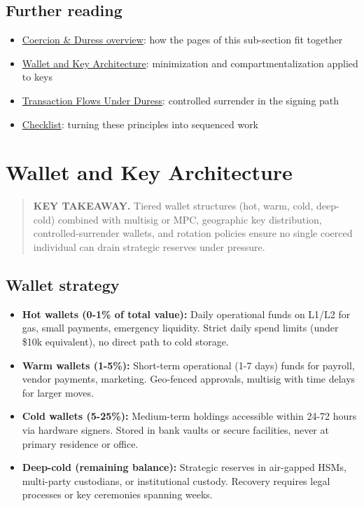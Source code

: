 \section{Further reading}\label{further-reading-2}

\begin{itemize}
\tightlist
\item
  \href{https://frameworks.securityalliance.dev/physical-security/coercion-and-duress/overview}{Coercion \& Duress overview}: how the pages of this sub-section fit together
\item
  \href{https://frameworks.securityalliance.dev/physical-security/coercion-and-duress/wallet-and-key-architecture}{Wallet and Key Architecture}: minimization and compartmentalization applied to keys
\item
  \href{https://frameworks.securityalliance.dev/physical-security/coercion-and-duress/transaction-flows-under-duress}{Transaction Flows Under Duress}: controlled surrender in the signing path
\item
  \href{https://frameworks.securityalliance.dev/physical-security/coercion-and-duress/checklist}{Checklist}: turning these principles into sequenced work
\end{itemize}

\chapter{Wallet and Key Architecture}\label{wallet-and-key-architecture}

\begin{quote}
\textbf{KEY TAKEAWAY.} Tiered wallet structures (hot, warm, cold, deep-cold) combined with multisig or MPC, geographic key distribution, controlled-surrender wallets, and rotation policies ensure no single coerced individual can drain strategic reserves under pressure.
\end{quote}

\section{Wallet strategy}\label{wallet-strategy}

\begin{itemize}
\tightlist
\item
  \textbf{Hot wallets (0-1\% of total value):} Daily operational funds on L1/L2 for gas, small payments, emergency liquidity. Strict daily spend limits (under \$10k equivalent), no direct path to cold storage.
\item
  \textbf{Warm wallets (1-5\%):} Short-term operational (1-7 days) funds for payroll, vendor payments, marketing. Geo-fenced approvals, multisig with time delays for larger moves.
\item
  \textbf{Cold wallets (5-25\%):} Medium-term holdings accessible within 24-72 hours via hardware signers. Stored in bank vaults or secure facilities, never at primary residence or office.
\item
  \textbf{Deep-cold (remaining balance):} Strategic reserves in air-gapped HSMs, multi-party custodians, or institutional custody. Recovery requires legal processes or key ceremonies spanning weeks.
\end{itemize}


